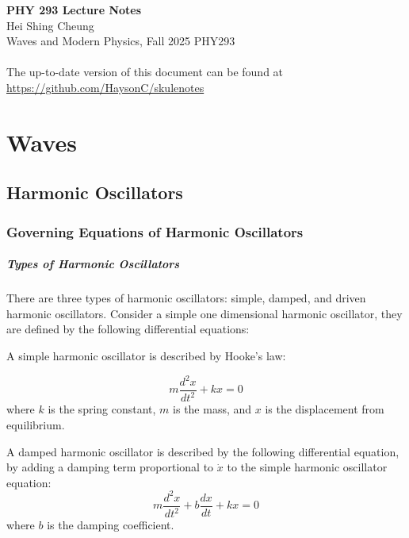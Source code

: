 \documentclass[11pt]{report}
\begin{document}
\thispagestyle{empty}
{\LARGE \bf PHY 293 Lecture Notes}\\
{\large Hei Shing Cheung}\\
Waves and Modern Physics, Fall 2025 \hfill PHY293\\
\\
The up-to-date version of this document can be found at \url{https://github.com/HaysonC/skulenotes}\\

\chapter{Waves}
\section{Harmonic Oscillators}

\subsection{Governing Equations of Harmonic Oscillators}

\paragraph{Types of Harmonic Oscillators} There are three types of harmonic oscillators: simple, damped, and driven harmonic oscillators. Consider a simple one dimensional harmonic oscillator, they are defined by the following differential equations:

\begin{definition}
    A simple harmonic oscillator is described by Hooke's law:

    \begin{equation} \label{eq:hooke}
        m \frac{d^2 x}{dt^2} + kx = 0
    \end{equation}
    where \( k \) is the spring constant, \( m \) is the mass, and \( x \) is the displacement from equilibrium.
\end{definition}

\begin{definition}
    A damped harmonic oscillator is described by the following differential equation, by adding a damping term proportional to $\dot{x}$ to the simple harmonic oscillator equation:
    \begin{equation} \label{eq:damped_ho}
        m \frac{d^2 x}{dt^2} + b \frac{dx}{dt} + kx = 0   
    \end{equation}
    where \( b \) is the damping coefficient.
\end{definition}
\end{document}
